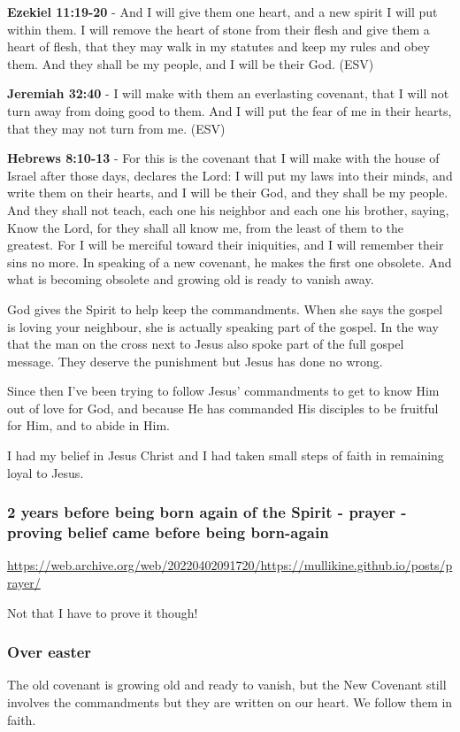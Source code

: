 \documentclass[11pt]{article}
\begin{document}
\textbf{Ezekiel 11:19-20} - And I will give them one heart, and a new spirit I will put within them. I will remove the heart of stone from their flesh and give them a heart of flesh, that they may walk in my statutes and keep my rules and obey them. And they shall be my people, and I will be their God. (ESV)

\textbf{Jeremiah 32:40} - I will make with them an everlasting covenant, that I will not turn away from doing good to them. And I will put the fear of me in their hearts, that they may not turn from me. (ESV)

\textbf{Hebrews 8:10-13} - For this is the covenant that I will make with the house of Israel after those days, declares the Lord: I will put my laws into their minds, and write them on their hearts, and I will be their God, and they shall be my people. And they shall not teach, each one his neighbor and each one his brother, saying, Know the Lord, for they shall all know me, from the least of them to the greatest. For I will be merciful toward their iniquities, and I will remember their sins no more. In speaking of a new covenant, he makes the first one obsolete. And what is becoming obsolete and growing old is ready to vanish away.

God gives the Spirit to help keep the commandments. When she says the gospel is loving your neighbour, she is actually speaking part of the gospel. In the way that the man on the cross next to Jesus also spoke part of the full gospel message. They deserve the punishment but Jesus has done no wrong.

Since then I've been trying to follow Jesus' commandments to get to know Him out of love for God, and because He has commanded His disciples to be fruitful for Him, and to abide in Him.

I had my belief in Jesus Christ and I had taken small steps of faith in remaining loyal to Jesus.

\subsubsection{2 years before being born again of the Spirit - prayer - proving belief came before being born-again}
\label{sec:org3f07117}
\url{https://web.archive.org/web/20220402091720/https://mullikine.github.io/posts/prayer/}

Not that I have to prove it though!

\subsubsection{Over easter}
\label{sec:orgcdc3303}
The old covenant is growing old and ready to vanish, but the New Covenant still involves the commandments but they are written on our heart.
We follow them in faith.
\end{document}
